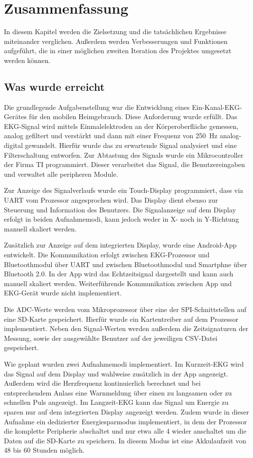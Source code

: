 
\section{Zusammenfassung}

In diesem Kapitel werden die Zielsetzung und die tatsächlichen Ergebnisse miteinander verglichen. Außerdem werden Verbesserungen und Funktionen aufgeführt, die in einer möglichen zweiten Iteration des Projektes umgesetzt werden können.

\subsection{Was wurde erreicht}

Die grundlegende Aufgabenstellung war die Entwicklung eines Ein-Kanal-EKG-Gerätes für den mobilen Heimgebrauch. Diese Anforderung wurde erfüllt. Das EKG-Signal wird mittels Einmalelektroden an der Körperoberfläche gemessen, analog gefiltert und verstärkt und dann mit einer Frequenz von \SI{250}{\hertz} analog-digital gewandelt. Hierfür wurde das zu erwartende Signal analysiert und eine Filterschaltung entworfen. Zur Abtastung des Signals wurde ein Mikrocontroller der Firma TI programmiert. Dieser verarbeitet das Signal, die Benutzereingaben und verwaltet alle peripheren Module. 

Zur Anzeige des Signalverlaufs wurde ein Touch-Display programmiert, dass via UART vom Prozessor angesprochen wird. Das Display dient ebenso zur Steuerung und Information des Benutzers. Die Signalanzeige auf dem Display erfolgt in beiden Aufnahmemodi, kann jedoch weder in X- noch in Y-Richtung manuell skaliert werden. 

Zusätzlich zur Anzeige auf dem integrierten Display, wurde eine Android-App entwickelt. Die Kommunikation erfolgt zwischen EKG-Prozessor und Bluetoothmodul über UART und zwischen Bluetoothmodul und Smartphne über Bluetooth 2.0. In der App wird das Echtzeitsignal dargestellt und kann auch manuell skaliert werden. Weiterführende Kommunikation zwischen App und EKG-Gerät wurde nicht implementiert.

Die ADC-Werte werden vom Mikroprozessor über eine der SPI-Schnittstellen auf eine SD-Karte gespeichert. Hierfür wurde ein Kartentreiber auf dem Prozessor implementiert. Neben den Signal-Werten werden außerdem die Zeitsignaturen der Messung, sowie der ausgewählte Benutzer auf der jeweiligen CSV-Datei gespeichert. 

Wie geplant wurden zwei Aufnahmemodi implementiert. Im Kurzzeit-EKG wird das Signal auf dem Display und wahlweise zusätzlich in der App angezeigt. Außerdem wird die Herzfrequenz kontinuierlich berechnet und bei entsprechendem Anlass eine Warnmeldung über einen zu langsamen oder zu schnellen Puls angezeigt. Im Langzeit-EKG kann das Signal um Energie zu sparen nur auf dem integrierten Display angezeigt werden. Zudem wurde in dieser Aufnahme ein dedizierter Energiesparmodus implementiert, in dem der Prozessor die komplette Peripherie abschaltet und nur etwa alle \SI{4}{\sec} wieder anschaltet um die Daten auf die SD-Karte zu speichern. In diesem Modus ist eine Akkulaufzeit von 48 bis 60 Stunden möglich.

